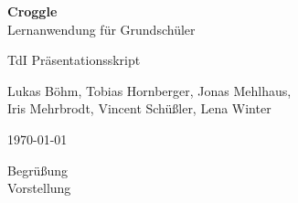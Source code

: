 \documentclass{scrartcl}
\begin{document}
	\begin{titlepage}
		\begin{center}
			{\huge \bfseries Croggle}\\[0.1cm]
			{\large  Lernanwendung für Grundschüler}
		\end{center}


		\begin{center}
			{\Large TdI Präsentationsskript}\\[0.5cm]
		\end{center}
		\begin{center}
			{Lukas Böhm, Tobias Hornberger, Jonas Mehlhaus, \\ Iris Mehrbrodt, Vincent Schüßler, Lena Winter} \\[1cm]
		\end{center}

		\begin{center}
			{\large \today}
		\end{center}
	\end{titlepage}

	Begrüßung\\
	Vorstellung
\end{document}
